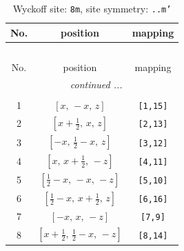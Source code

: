 \documentclass[fleqn,8pt]{jsarticle}
\begin{document}
\begin{longtable}{ccc}
\caption{Wyckoff site: {\tt 8m}, site symmetry: {\tt ..m'}}
 \\
 \hline \hline
No. & position & mapping \\ \hline \endfirsthead

\multicolumn{2}{l}{\tablename\ \thetable{}} \\
 \hline \hline
No. & position & mapping \\ \hline \endhead

 \hline \hline
\multicolumn{2}{r}{\footnotesize\it continued ...} \\ \endfoot

 \hline \hline
\multicolumn{2}{r}{} \\ \endlastfoot

1 & $\left[ x,\, - x,\, z \right]$ & {\tt [1,15]} \\ \hline
2 & $\left[ x + \frac{1}{2},\, x,\, z \right]$ & {\tt [2,13]} \\ \hline
3 & $\left[ - x,\, \frac{1}{2} - x,\, z \right]$ & {\tt [3,12]} \\ \hline
4 & $\left[ x,\, x + \frac{1}{2},\, - z \right]$ & {\tt [4,11]} \\ \hline
5 & $\left[ \frac{1}{2} - x,\, - x,\, - z \right]$ & {\tt [5,10]} \\ \hline
6 & $\left[ \frac{1}{2} - x,\, x + \frac{1}{2},\, z \right]$ & {\tt [6,16]} \\ \hline
7 & $\left[ - x,\, x,\, - z \right]$ & {\tt [7,9]} \\ \hline
8 & $\left[ x + \frac{1}{2},\, \frac{1}{2} - x,\, - z \right]$ & {\tt [8,14]} \\
\end{longtable}
\renewcommand{\arraystretch}{1.2}
\end{document}
